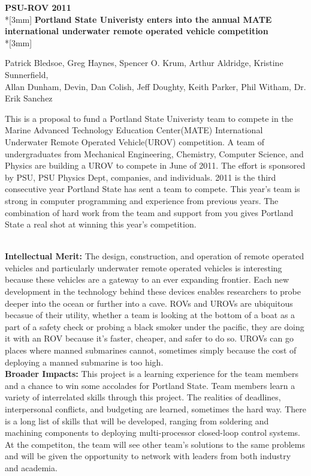 \documentclass{proposalnsf}
\begin{document}
\begin{center}
{\Large{\bf PSU-ROV 2011}}\\*[3mm]
{\bf Portland State Univeristy enters into the annual MATE international underwater remote operated vehicle competition} \\*[3mm]

Patrick Bledsoe, Greg Haynes, Spencer O. Krum, Arthur Aldridge, Kristine Sunnerfield,\\
 Allan Dunham, Devin, Dan Colish, Jeff Doughty, Keith Parker, Phil Witham, Dr. Erik Sanchez

\end{center}


This is a  proposal to fund a Portland State Univeristy team to compete in the Marine Advanced Technology Education Center(MATE)
 International Underwater Remote Operated Vehicle(UROV) competition. A team of undergraduates from Mechanical Engineering,
 Chemistry, Computer Science, and Physics are building a UROV to compete in June of 2011. The effort is sponsored by PSU, 
PSU Physics Dept, companies, and individuals. 2011 is the third consecutive year Portland State has sent a team to compete.
This year's team is strong in computer programming and experience from previous years. The combination of hard work from the team and 
support from you gives Portland State a real shot at winning this year's competition.  



\ \\
\noindent
{\bf Intellectual Merit:}
The design, construction, and operation of remote operated vehicles and particularly underwater remote operated vehicles is interesting
because these vehicles are a gateway to an ever expanding frontier. Each new development in the technology behind these devices enables 
researchers to probe deeper into the ocean or further into a cave. ROVs and UROVs are ubiquitous becasue of their utility, whether a team
is looking at the bottom of a boat as a part of a safety check or probing a black smoker under the pacific, they are doing it with an ROV
because it's faster, cheaper, and safer to do so. UROVs can go places where manned submarines cannot, sometimes simply because the cost 
of deploying a manned submarine is too high.  
\ \\

\noindent
{\bf Broader Impacts:}
This project is a learning experience for the team members and a chance to win some accolades for Portland State. Team members learn 
a variety of interrelated skills through this project. The realities of deadlines, interpersonal conflicts, and budgeting are learned, 
sometimes the hard way. There is a long list of skills that will be developed, ranging from soldering and machining components to deploying 
multi-processor closed-loop control systems. At the competiton, the team will see other team's solutions to the same problems and will be
 given the opportunity to network with leaders from both industry and academia. 
\renewcommand{\thepage} {B--\arabic{page}}
\end{document}
